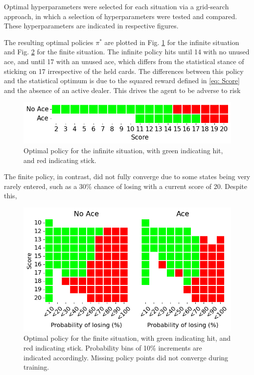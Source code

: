 Optimal hyperparameters were selected for each situation via a grid-search approach, in which a selection of hyperparameters were tested and compared. These hyperparameters are indicated in respective figures. 

The resulting optimal policies \(\pi^*\) are plotted in Fig. \ref{fig: Optimal policy - Infinite} for the infinite situation and Fig. \ref{fig: Optimal policy - Finite} for the finite situation. The infinite policy hits until 14 with no unused ace, and until 17 with an unused ace, which differs from the statistical stance of sticking on 17 irrespective of the held cards. The differences between this policy and the statistical optimum is due to the squared reward defined in \ref{eq: Score} and the absence of an active dealer. This drives the agent to be adverse to risk

\begin{figure}[ht]
    \centering
    \includegraphics[width=\singlefigure]{figures/infinite_optimal_policy.png}
    \caption{Optimal policy for the infinite situation, with green indicating hit, and red indicating stick.}
    \label{fig: Optimal policy - Infinite} 
\end{figure}

The finite policy, in contrast, did not fully converge due to some states being very rarely entered, such as a 30\% chance of losing with a current score of 20. Despite this, 



\begin{figure}[ht]
    \centering
    \includegraphics[width=\singlefigure]{figures/finite_optimal_policy.png}
    \caption{Optimal policy for the finite situation, with green indicating hit, and red indicating stick. Probability bins of 10\% increments are indicated accordingly. Missing policy points did not converge during training.}
    \label{fig: Optimal policy - Finite} 
\end{figure}

